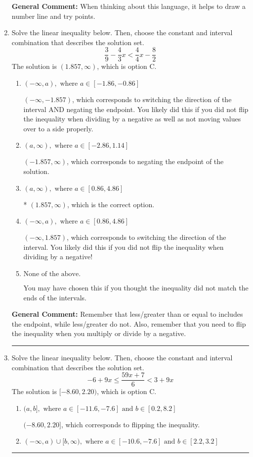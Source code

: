 \documentclass{extbook}[14pt]
\newcommand{\litem}[1]{\item #1

\rule{\textwidth}{0.4pt}}
\begin{document}
\begin{enumerate}
{\textbf{General Comment:} When thinking about this language, it helps to draw a number line and try points.
}
\litem{
Solve the linear inequality below. Then, choose the constant and interval combination that describes the solution set.
\[ \frac{3}{9} - \frac{4}{3} x < \frac{4}{4} x - \frac{8}{2} \]The solution is \( (1.857, \infty) \), which is option C.\begin{enumerate}[label=\Alph*.]
\item \( (-\infty, a), \text{ where } a \in [-1.86, -0.86] \)

 $(-\infty, -1.857)$, which corresponds to switching the direction of the interval AND negating the endpoint. You likely did this if you did not flip the inequality when dividing by a negative as well as not moving values over to a side properly.
\item \( (a, \infty), \text{ where } a \in [-2.86, 1.14] \)

 $(-1.857, \infty)$, which corresponds to negating the endpoint of the solution.
\item \( (a, \infty), \text{ where } a \in [0.86, 4.86] \)

* $(1.857, \infty)$, which is the correct option.
\item \( (-\infty, a), \text{ where } a \in [0.86, 4.86] \)

 $(-\infty, 1.857)$, which corresponds to switching the direction of the interval. You likely did this if you did not flip the inequality when dividing by a negative!
\item \( \text{None of the above}. \)

You may have chosen this if you thought the inequality did not match the ends of the intervals.
\end{enumerate}

\textbf{General Comment:} Remember that less/greater than or equal to includes the endpoint, while less/greater do not. Also, remember that you need to flip the inequality when you multiply or divide by a negative.
}
\litem{
Solve the linear inequality below. Then, choose the constant and interval combination that describes the solution set.
\[ -6 + 9 x \leq \frac{59 x + 7}{6} < 3 + 9 x \]The solution is \( [-8.60, 2.20) \), which is option C.\begin{enumerate}[label=\Alph*.]
\item \( (a, b], \text{ where } a \in [-11.6, -7.6] \text{ and } b \in [0.2, 8.2] \)

$(-8.60, 2.20]$, which corresponds to flipping the inequality.
\item \( (-\infty, a) \cup [b, \infty), \text{ where } a \in [-10.6, -7.6] \text{ and } b \in [2.2, 3.2] \)


\end{enumerate}}
\end{enumerate}
\end{document}
